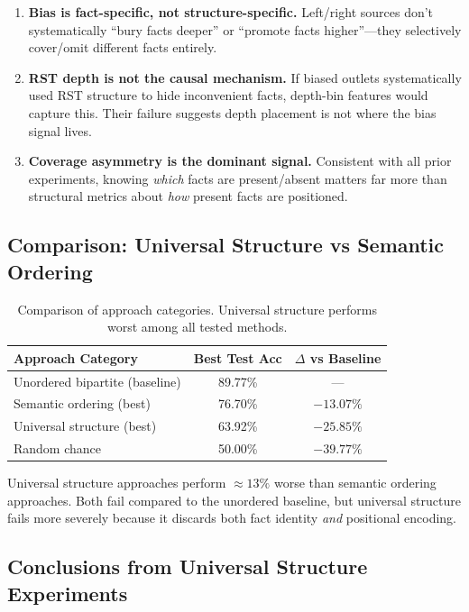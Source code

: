 \documentclass[12pt,a4paper]{article}
\begin{document}
\begin{enumerate}
\item \textbf{Bias is fact-specific, not structure-specific.} Left/right sources don't
      systematically ``bury facts deeper'' or ``promote facts higher''---they selectively
      cover/omit different facts entirely.

\item \textbf{RST depth is not the causal mechanism.} If biased outlets systematically used
      RST structure to hide inconvenient facts, depth-bin features would capture this.
      Their failure suggests depth placement is not where the bias signal lives.

\item \textbf{Coverage asymmetry is the dominant signal.} Consistent with all prior experiments,
      knowing \textit{which} facts are present/absent matters far more than structural metrics
      about \textit{how} present facts are positioned.
\end{enumerate}

\subsection{Comparison: Universal Structure vs Semantic Ordering}

\begin{table}[h]
\centering
\begin{tabular}{lcc}
\hline
\textbf{Approach Category} & \textbf{Best Test Acc} & \textbf{$\Delta$ vs Baseline} \\
\hline
Unordered bipartite (baseline) & 89.77\% & --- \\
Semantic ordering (best) & 76.70\% & $-13.07\%$ \\
Universal structure (best) & 63.92\% & $-25.85\%$ \\
Random chance & 50.00\% & $-39.77\%$ \\
\hline
\end{tabular}
\caption{Comparison of approach categories. Universal structure performs worst among all tested methods.}
\label{tab:approach_comparison}
\end{table}

Universal structure approaches perform $\approx13\%$ worse than semantic ordering approaches.
Both fail compared to the unordered baseline, but universal structure fails more severely
because it discards both fact identity \textit{and} positional encoding.

\subsection{Conclusions from Universal Structure Experiments}
\end{document}
